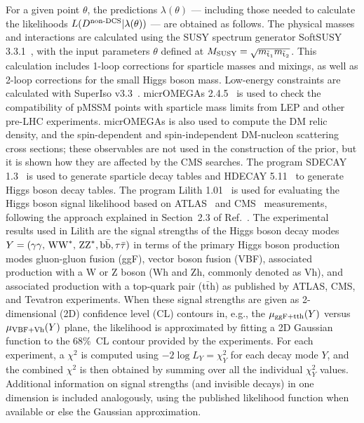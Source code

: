 For a given point $\theta$, the predictions $\lambda(\theta)$ --- including those needed
to calculate the likelihoods $L(D^{\text{non-DCS}}|\lambda(\theta))$ --- are obtained as follows. 
The physical masses and interactions are calculated 
using the SUSY spectrum generator {\sc SoftSUSY} 3.3.1~\cite{Allanach:2001kg},
with the input parameters $\theta$ defined at $M_{\rm SUSY}=\sqrt{m_{\tilde{\text{t}}_{1}}m_{\tilde{\text{t}}_{2}}}$. 
This calculation includes 1-loop corrections for sparticle masses and mixings, 
as well as 2-loop corrections for the small Higgs boson mass.
Low-energy constraints are calculated with {\sc SuperIso}
v3.3~\cite{Mahmoudi:2008tp}. {\sc micrOMEGAs} 2.4.5~\cite{Belanger:2001fz,Belanger:2004yn,Belanger:2008sj} is used 
to check the compatibility of pMSSM points with sparticle mass limits from LEP and other pre-LHC experiments. {\sc micrOMEGAs} is also used to compute the DM relic density, and the spin-dependent and spin-independent DM-nucleon scattering cross sections; these observables are not used in the construction of the prior, but it is shown how they are affected by the CMS searches. The program  {\sc SDECAY} 1.3~\cite{Muhlleitner:2003vg} is used to generate sparticle decay tables and 
{\sc HDECAY} 5.11~\cite{Djouadi:1997yw} to generate Higgs boson decay tables.
The program {\sc Lilith} 1.01~\cite{Bernon:2014vta,Bernon:2015hsa} is used for evaluating the Higgs boson signal likelihood based on ATLAS~\cite{ATLAS-CONF-2014-009}
and CMS~\cite{Khachatryan:2014jba} measurements, following the approach
explained in Section~2.3 of Ref.~\cite{Dumont:2013npa}. The experimental results used in {\sc Lilith} are the signal strengths
of the Higgs boson decay modes $Y=(\gamma\gamma,\,{\rm WW}^*,\,{\rm ZZ}^*,{\rm
  b}\bar {\rm b},\tau\bar{\tau})$ in terms of the primary Higgs boson production modes
gluon-gluon fusion (ggF), vector boson fusion (VBF), associated
production with a W or Z boson (Wh and Zh, commonly denoted as
Vh), and associated production with a top-quark pair (t$\bar{\text{t}}$h) as
published by ATLAS, CMS,
and Tevatron experiments.
When these signal strengths are given as 2-dimensional (2D) confidence level (CL) contours in, e.g., the
$\mu_{\rm ggF+tth}(Y)$ versus $\mu_{\rm VBF+Vh}(Y)$ plane, the
likelihood is approximated by fitting a 2D Gaussian function to the 68\%~CL
contour provided by the experiments.
For each experiment, a $\chi^2$ is computed using $- 2 \log L_Y
= \chi_Y^2$ for each decay mode $Y$, and the combined $\chi^2$ is
then obtained by summing over all the individual $\chi_Y^2$ values.
Additional information on signal strengths (and invisible decays) in
one dimension is included analogously, using the published likelihood function
when available or else the Gaussian approximation.
 
